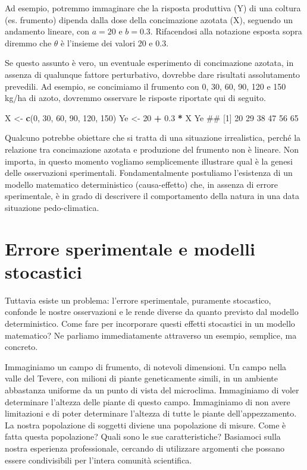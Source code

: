 \documentclass[a4paper,12pt,oneside]{book}
\newenvironment{Shaded}{\begin{snugshade}}{\end{snugshade}}
\newcommand{\KeywordTok}[1]{\textcolor[rgb]{0.13,0.29,0.53}{\textbf{#1}}}
\newcommand{\DecValTok}[1]{\textcolor[rgb]{0.00,0.00,0.81}{#1}}
\newcommand{\FloatTok}[1]{\textcolor[rgb]{0.00,0.00,0.81}{#1}}
\newcommand{\StringTok}[1]{\textcolor[rgb]{0.31,0.60,0.02}{#1}}
\newcommand{\OperatorTok}[1]{\textcolor[rgb]{0.81,0.36,0.00}{\textbf{#1}}}
\newcommand{\NormalTok}[1]{#1}
\theoremstyle{definition}
\theoremstyle{definition}
\theoremstyle{definition}
\theoremstyle{remark}
\begin{document}
Ad esempio, potremmo immaginare che la risposta produttiva (Y) di una
coltura (es. frumento) dipenda dalla dose della concimazione azotata
(X), seguendo un andamento lineare, con \(a = 20\) e \(b = 0.3\).
Rifacendosi alla notazione esposta sopra diremmo che \(\theta\) è
l'insieme dei valori 20 e 0.3.

Se questo assunto è vero, un eventuale esperimento di concimazione
azotata, in assenza di qualunque fattore perturbativo, dovrebbe dare
risultati assolutamento prevedili. Ad esempio, se concimiamo il frumento
con 0, 30, 60, 90, 120 e 150 kg/ha di azoto, dovremmo osservare le
risposte riportate qui di seguito.

\begin{Shaded}
\begin{Highlighting}[]
\NormalTok{X <-}\StringTok{ }\KeywordTok{c}\NormalTok{(}\DecValTok{0}\NormalTok{, }\DecValTok{30}\NormalTok{, }\DecValTok{60}\NormalTok{, }\DecValTok{90}\NormalTok{, }\DecValTok{120}\NormalTok{, }\DecValTok{150}\NormalTok{)}
\NormalTok{Ye <-}\StringTok{ }\DecValTok{20} \OperatorTok{+}\StringTok{ }\FloatTok{0.3} \OperatorTok{*}\StringTok{ }\NormalTok{X}
\NormalTok{Ye}
\NormalTok{## [1] 20 29 38 47 56 65}
\end{Highlighting}
\end{Shaded}

Qualcuno potrebbe obiettare che si tratta di una situazione
irrealistica, perché la relazione tra concimazione azotata e produzione
del frumento non è lineare. Non importa, in questo momento vogliamo
semplicemente illustrare qual è la genesi delle osservazioni
sperimentali. Fondamentalmente postuliamo l'esistenza di un modello
matematico deterministico (causa-effetto) che, in assenza di errore
sperimentale, è in grado di descrivere il comportamento della natura in
una data situazione pedo-climatica.

\section{Errore sperimentale e modelli
stocastici}\label{errore-sperimentale-e-modelli-stocastici}

Tuttavia esiste un problema: l'errore sperimentale, puramente
stocastico, confonde le nostre osservazioni e le rende diverse da quanto
previsto dal modello deterministico. Come fare per incorporare questi
effetti stocastici in un modello matematico? Ne parliamo immediatamente
attraverso un esempio, semplice, ma concreto.

Immaginiamo un campo di frumento, di notevoli dimensioni. Un campo nella
valle del Tevere, con milioni di piante geneticamente simili, in un
ambiente abbastanza uniforme da un punto di vista del microclima.
Immaginiamo di voler determinare l'altezza delle piante di questo campo.
Immaginiamo di non avere limitazioni e di poter determinare l'altezza di
tutte le piante dell'appezzamento. La nostra popolazione di soggetti
diviene una popolazione di misure. Come è fatta questa popolazione?
Quali sono le sue caratteristiche? Basiamoci sulla nostra esperienza
professionale, cercando di utilizzare argomenti che possano essere
condivisibili per l'intera comunità scientifica.
\end{document}
